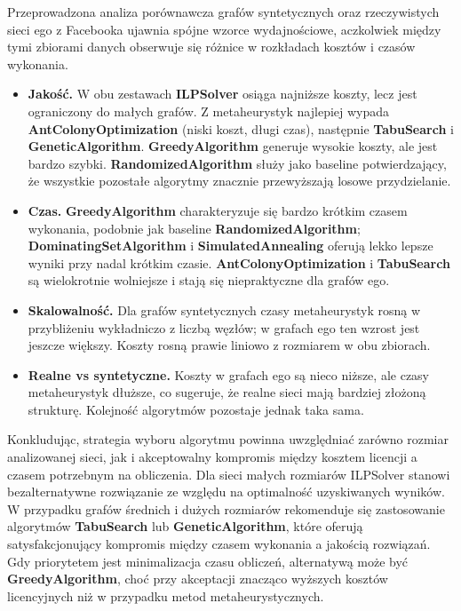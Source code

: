 Przeprowadzona analiza porównawcza grafów syntetycznych oraz rzeczywistych sieci ego z Facebooka ujawnia spójne wzorce wydajnościowe, aczkolwiek między tymi zbiorami danych obserwuje się różnice w rozkładach kosztów i czasów wykonania.

\begin{itemize}
\item \textbf{Jakość.} W obu zestawach \textbf{ILPSolver} osiąga najniższe koszty, lecz jest ograniczony do małych grafów. Z metaheurystyk najlepiej wypada \textbf{AntColonyOptimization} (niski koszt, długi czas), następnie \textbf{TabuSearch} i \textbf{GeneticAlgorithm}. \textbf{GreedyAlgorithm} generuje wysokie koszty, ale jest bardzo szybki. \textbf{RandomizedAlgorithm} służy jako baseline potwierdzający, że wszystkie pozostałe algorytmy znacznie przewyższają losowe przydzielanie.

\item \textbf{Czas.} \textbf{GreedyAlgorithm} charakteryzuje się bardzo krótkim czasem wykonania, podobnie jak baseline \textbf{RandomizedAlgorithm}; \textbf{DominatingSetAlgorithm} i \textbf{SimulatedAnnealing} oferują lekko lepsze wyniki przy nadal krótkim czasie. \textbf{AntColonyOptimization} i \textbf{TabuSearch} są wielokrotnie wolniejsze i stają się niepraktyczne dla grafów ego.

\item \textbf{Skalowalność.} Dla grafów syntetycznych czasy metaheurystyk rosną w przybliżeniu wykładniczo z liczbą węzłów; w grafach ego ten wzrost jest jeszcze większy. Koszty rosną prawie liniowo z rozmiarem w obu zbiorach.

\item \textbf{Realne vs syntetyczne.} Koszty w grafach ego są nieco niższe, ale czasy metaheurystyk dłuższe, co sugeruje, że realne sieci mają bardziej złożoną strukturę. Kolejność algorytmów pozostaje jednak taka sama.
\end{itemize}

Konkludując, strategia wyboru algorytmu powinna uwzględniać zarówno rozmiar analizowanej sieci, jak i akceptowalny kompromis między kosztem licencji a czasem potrzebnym na obliczenia. Dla sieci małych rozmiarów ILPSolver stanowi bezalternatywne rozwiązanie ze względu na optimalność uzyskiwanych wyników. W przypadku grafów średnich i dużych rozmiarów rekomenduje się zastosowanie algorytmów \textbf{TabuSearch} lub \textbf{GeneticAlgorithm}, które oferują satysfakcjonujący kompromis między czasem wykonania a jakością rozwiązań. Gdy priorytetem jest minimalizacja czasu obliczeń, alternatywą może być \textbf{GreedyAlgorithm}, choć przy akceptacji znacząco wyższych kosztów licencyjnych niż w przypadku metod metaheurystycznych.



